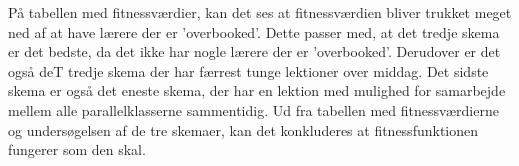 På tabellen med fitnessværdier, kan det ses at fitnessværdien bliver trukket meget ned af at have lærere der er ’overbooked’. Dette passer med, at det tredje skema er det bedste, da det ikke har nogle lærere der er ’overbooked’. Derudover er det også deT tredje skema der har færrest tunge lektioner over middag. Det sidste skema er også det eneste skema, der har en lektion med mulighed for samarbejde mellem alle parallelklasserne sammentidig. 
Ud fra tabellen med fitnessværdierne og undersøgelsen af de tre skemaer, kan det konkluderes at fitnessfunktionen fungerer som den skal. 
